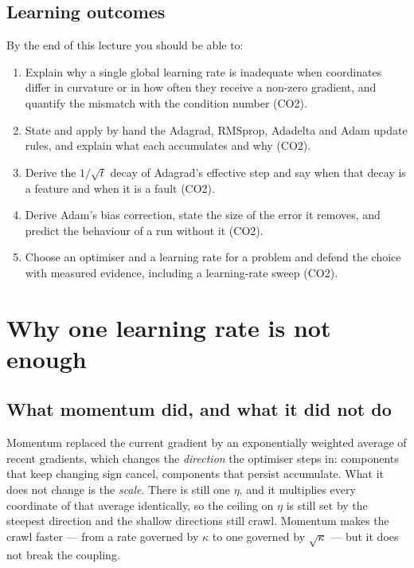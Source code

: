 \documentclass[11pt]{article}
\begin{document}
\subsection{Learning outcomes}

By the end of this lecture you should be able to:

\begin{enumerate}[leftmargin=*]
  \item Explain why a single global learning rate is inadequate when
    coordinates differ in curvature or in how often they receive a non-zero
    gradient, and quantify the mismatch with the condition number (CO2).
  \item State and apply by hand the Adagrad, RMSprop, Adadelta and Adam update
    rules, and explain what each accumulates and why (CO2).
  \item Derive the $1/\sqrt{t}$ decay of Adagrad's effective step and say when
    that decay is a feature and when it is a fault (CO2).
  \item Derive Adam's bias correction, state the size of the error it removes,
    and predict the behaviour of a run without it (CO2).
  \item Choose an optimiser and a learning rate for a problem and defend the
    choice with measured evidence, including a learning-rate sweep (CO2).
\end{enumerate}

\section{Why one learning rate is not enough}
\label{sec:why}

\subsection{What momentum did, and what it did not do}

Momentum replaced the current gradient by an exponentially weighted average of
recent gradients, which changes the \emph{direction} the optimiser steps in:
components that keep changing sign cancel, components that persist accumulate.
What it does not change is the \emph{scale}. There is still one $\eta$, and it
multiplies every coordinate of that average identically, so the ceiling on
$\eta$ is still set by the steepest direction and the shallow directions still
crawl. Momentum makes the crawl faster --- from a rate governed by $\kappa$ to
one governed by $\sqrt{\kappa}$ --- but it does not break the coupling.
\end{document}
